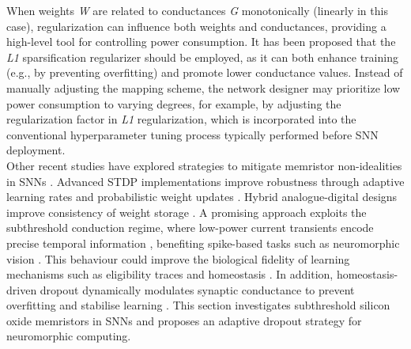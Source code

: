 \noindent When weights \textit{W} are related to conductances \textit{G} monotonically (linearly in this case), regularization can influence both weights and conductances, providing a high-level tool for controlling power consumption. It has been proposed that the \textit{L1} sparsification regularizer \cite{han2015learning} should be employed, as it can both enhance training (e.g., by preventing overfitting) and promote lower conductance values. Instead of manually adjusting the mapping scheme, the network designer may prioritize low power consumption to varying degrees, for example, by adjusting the regularization factor in \textit{L1} regularization, which is incorporated into the conventional hyperparameter tuning process \cite{feurer2019hyperparameter} typically performed before SNN deployment.\\

\noindent Other recent studies have explored strategies to mitigate memristor non-idealities in SNNs \cite{morshed2023choose}. Advanced STDP implementations improve robustness through adaptive learning rates and probabilistic weight updates \cite{burr2017neuromorphic, pehle2022brainscales}. Hybrid analogue-digital designs improve consistency of weight storage \cite{friedmann2016demonstrating}. A promising approach exploits the subthreshold conduction regime, where low-power current transients encode precise temporal information \cite{mannion2023unipolar}, benefiting spike-based tasks such as neuromorphic vision \cite{mannion2020memristor}. This behaviour could improve the biological fidelity of learning mechanisms such as eligibility traces and homeostasis \cite{demiraug2021pcm, john2022reconfigurable}. In addition, homeostasis-driven dropout dynamically modulates synaptic conductance to prevent overfitting and stabilise learning \cite{vu2024spiking}. This section investigates subthreshold silicon oxide memristors in SNNs and proposes an adaptive dropout strategy for neuromorphic computing.\\

